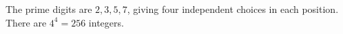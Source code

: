 The prime digits are $2,3,5,7$, giving four independent choices in each position. There are $4^4=\boxed{256}$ integers.
